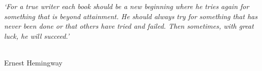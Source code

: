 \cleardoublepage

\narrowlinespacing

\vspace*{4mm}
\emph{`For a true writer each book should be a new beginning where he tries again for something that is beyond attainment. He should always try for something that has never been done or that others have tried and failed. Then sometimes, with great luck, he will succeed.'}\\
\\

\normallinespacing

\hfill \hfill Ernest Hemingway